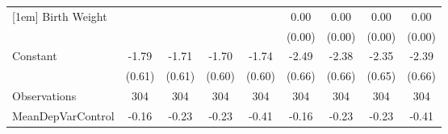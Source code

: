 {\begin{tabular}{l*{8}{c}}
[1em]
Birth Weight        &                     &                     &                     &                     &        0.00\sym{**} &        0.00\sym{**} &        0.00\sym{**} &        0.00\sym{**} \\
                    &                     &                     &                     &                     &      (0.00)         &      (0.00)         &      (0.00)         &      (0.00)         \\
[1em]
Constant            &       -1.79\sym{***}&       -1.71\sym{***}&       -1.70\sym{***}&       -1.74\sym{***}&       -2.49\sym{***}&       -2.38\sym{***}&       -2.35\sym{***}&       -2.39\sym{***}\\
                    &      (0.61)         &      (0.61)         &      (0.60)         &      (0.60)         &      (0.66)         &      (0.66)         &      (0.65)         &      (0.66)         \\
\hline
Observations        &         304         &         304         &         304         &         304         &         304         &         304         &         304         &         304         \\
MeanDepVarControl   &       -0.16         &       -0.23         &       -0.23         &       -0.41         &       -0.16         &       -0.23         &       -0.23         &       -0.41         \\
\hline\hline
\end{tabular}
}
